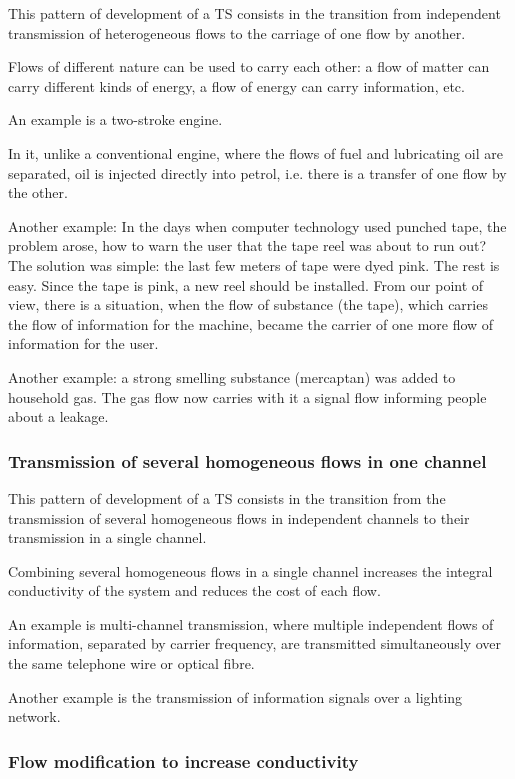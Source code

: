 \documentclass[a4paper,11pt]{article}
\begin{document}
This pattern of development of a TS consists in the transition from
independent transmission of heterogeneous flows to the carriage of one flow by
another.

Flows of different nature can be used to carry each other: a flow of matter
can carry different kinds of energy, a flow of energy can carry information,
etc.

An example is a two-stroke engine.

In it, unlike a conventional engine, where the flows of fuel and lubricating
oil are separated, oil is injected directly into petrol, i.e. there is a
transfer of one flow by the other.

Another example: In the days when computer technology used punched tape, the
problem arose, how to warn the user that the tape reel was about to run out?
The solution was simple: the last few meters of tape were dyed pink. The rest
is easy. Since the tape is pink, a new reel should be installed. From our
point of view, there is a situation, when the flow of substance (the tape),
which carries the flow of information for the machine, became the carrier of
one more flow of information for the user.

Another example: a strong smelling substance (mercaptan) was added to
household gas. The gas flow now carries with it a signal flow informing people
about a leakage.

\subsubsection{Transmission of several homogeneous flows in one channel}

This pattern of development of a TS consists in the transition from the
transmission of several homogeneous flows in independent channels to their
transmission in a single channel.

Combining several homogeneous flows in a single channel increases the integral
conductivity of the system and reduces the cost of each flow.

An example is multi-channel transmission, where multiple independent flows
of information, separated by carrier frequency, are transmitted simultaneously
over the same telephone wire or optical fibre.

Another example is the transmission of information signals over a lighting
network.

\subsubsection{Flow modification to increase conductivity}
\end{document}
